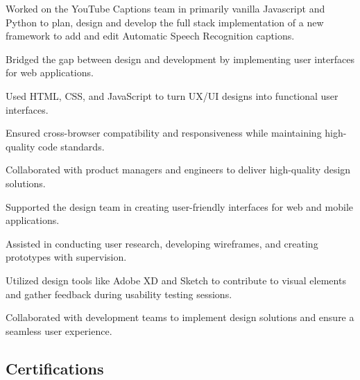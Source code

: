 \documentclass[letterpaper]{resume} %
\begin{document}
\begin{minipage}[t]{0.66\textwidth}
\begin{tightitemize}
\item Worked on the YouTube Captions team in primarily vanilla Javascript and Python to plan, design and develop the full stack implementation of a new framework to add and edit Automatic Speech Recognition captions.
\item Bridged the gap between design and development by implementing user interfaces for web applications.
\item Used HTML, CSS, and JavaScript to turn UX/UI designs into functional user interfaces.
\item Ensured cross-browser compatibility and responsiveness while maintaining high-quality code standards.
\item Collaborated with product managers and engineers to deliver high-quality design solutions.
\end{tightitemize}

\sectionspace %



\begin{tightitemize}
\item Supported the design team in creating user-friendly interfaces for web and mobile applications.
\item Assisted in conducting user research, developing wireframes, and creating prototypes with supervision.
\item Utilized design tools like Adobe XD and Sketch to contribute to visual elements and gather feedback during usability testing sessions.
\item Collaborated with development teams to implement design solutions and ensure a seamless user experience.
\end{tightitemize}

\sectionspace %


\subsection{Certifications}


\end{minipage}
\end{document}
